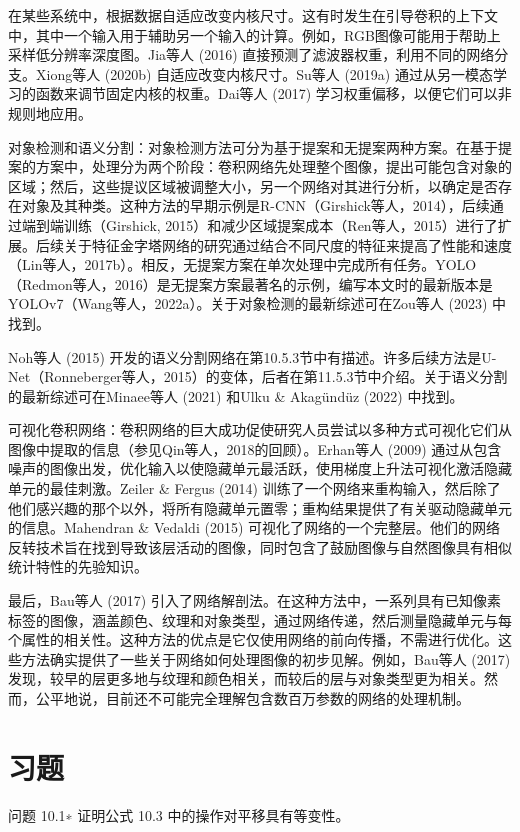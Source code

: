 \documentclass[lang=cn,newtx,10pt,scheme=chinese]{elegantbook}
\begin{document}
在某些系统中，根据数据自适应改变内核尺寸。这有时发生在引导卷积的上下文中，其中一个输入用于辅助另一个输入的计算。例如，RGB图像可能用于帮助上采样低分辨率深度图。Jia等人 (2016) 直接预测了滤波器权重，利用不同的网络分支。Xiong等人 (2020b) 自适应改变内核尺寸。Su等人 (2019a) 通过从另一模态学习的函数来调节固定内核的权重。Dai等人 (2017) 学习权重偏移，以便它们可以非规则地应用。

对象检测和语义分割：对象检测方法可分为基于提案和无提案两种方案。在基于提案的方案中，处理分为两个阶段：卷积网络先处理整个图像，提出可能包含对象的区域；然后，这些提议区域被调整大小，另一个网络对其进行分析，以确定是否存在对象及其种类。这种方法的早期示例是R-CNN（Girshick等人，2014），后续通过端到端训练（Girshick, 2015）和减少区域提案成本（Ren等人，2015）进行了扩展。后续关于特征金字塔网络的研究通过结合不同尺度的特征来提高了性能和速度（Lin等人，2017b）。相反，无提案方案在单次处理中完成所有任务。YOLO（Redmon等人，2016）是无提案方案最著名的示例，编写本文时的最新版本是YOLOv7（Wang等人，2022a）。关于对象检测的最新综述可在Zou等人 (2023) 中找到。

Noh等人 (2015) 开发的语义分割网络在第10.5.3节中有描述。许多后续方法是U-Net（Ronneberger等人，2015）的变体，后者在第11.5.3节中介绍。关于语义分割的最新综述可在Minaee等人 (2021) 和Ulku \& Akagündüz (2022) 中找到。

可视化卷积网络：卷积网络的巨大成功促使研究人员尝试以多种方式可视化它们从图像中提取的信息（参见Qin等人，2018的回顾）。Erhan等人 (2009) 通过从包含噪声的图像出发，优化输入以使隐藏单元最活跃，使用梯度上升法可视化激活隐藏单元的最佳刺激。Zeiler \& Fergus (2014) 训练了一个网络来重构输入，然后除了他们感兴趣的那个以外，将所有隐藏单元置零；重构结果提供了有关驱动隐藏单元的信息。Mahendran \& Vedaldi (2015) 可视化了网络的一个完整层。他们的网络反转技术旨在找到导致该层活动的图像，同时包含了鼓励图像与自然图像具有相似统计特性的先验知识。

最后，Bau等人 (2017) 引入了网络解剖法。在这种方法中，一系列具有已知像素标签的图像，涵盖颜色、纹理和对象类型，通过网络传递，然后测量隐藏单元与每个属性的相关性。这种方法的优点是它仅使用网络的前向传播，不需进行优化。这些方法确实提供了一些关于网络如何处理图像的初步见解。例如，Bau等人 (2017) 发现，较早的层更多地与纹理和颜色相关，而较后的层与对象类型更为相关。然而，公平地说，目前还不可能完全理解包含数百万参数的网络的处理机制。
\section{习题}  
问题 10.1∗ 证明公式 10.3 中的操作对平移具有等变性。
\end{document}
